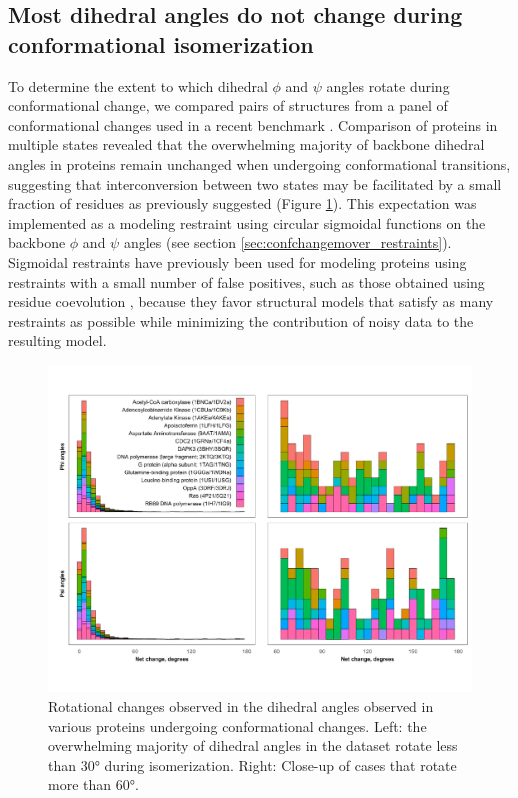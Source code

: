 \subsection{Most dihedral angles do not change during conformational isomerization}\label{sec:ccm_results_dihedrals}

To determine the extent to which dihedral $\phi$ and $\psi$ angles rotate during conformational change, we compared pairs of structures from a panel of conformational changes used in a recent benchmark \citep*{Jeschke2012a}. Comparison of proteins in multiple states revealed that the overwhelming majority of backbone dihedral angles in proteins remain unchanged when undergoing conformational transitions, suggesting that interconversion between two states may be facilitated by a small fraction of residues as previously suggested \citep*{Sauer2020} (Figure \ref{fig:ccm_angles}). This expectation was implemented as a modeling restraint using circular sigmoidal functions on the backbone $\phi$ and $\psi$ angles (see section \ref{sec:confchangemover_restraints}). Sigmoidal restraints have previously been used for modeling proteins using restraints with a small number of false positives, such as those obtained using residue coevolution \citep*{Ovchinnikov2015, Ovchinnikov2017, Teixeira2017}, because they favor structural models that satisfy as many restraints as possible while minimizing the contribution of noisy data to the resulting model. 

\begin{figure}[h]
\centering
\includegraphics[width=6.5in]{Figures/ccm_angles.pdf}
 \caption[Rotational changes observed in the dihedral angles of various proteins undergoing conformational changes.]{Rotational changes observed in the dihedral angles observed in various proteins undergoing conformational changes. Left: the overwhelming majority of dihedral angles in the dataset rotate less than 30° during isomerization. Right: Close-up of cases that rotate more than 60°.}
\label{fig:ccm_angles}
\end{figure}

